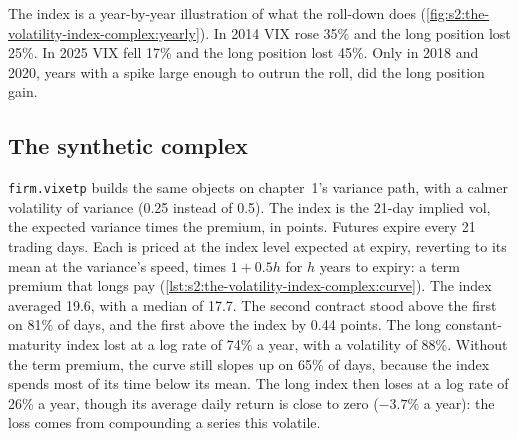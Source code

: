 \begin{omfigure}

\label{fig:s2:the-volatility-index-complex:yearly}
\end{omfigure}

The index is a year-by-year illustration of what the roll-down does (\cref{fig:s2:the-volatility-index-complex:yearly}). In 2014 VIX rose 35\% and the
long position lost 25\%. In 2025 VIX fell 17\% and the long position lost 45\%. Only in 2018 and 2020, years with a spike large enough to outrun the
roll, did the long position gain.

\subsection*{The synthetic complex}

\texttt{firm.vixetp} builds the same objects on chapter~1's variance path, with a calmer volatility of variance (0.25 instead of 0.5). The index is the
21-day implied vol, the expected variance times the premium, in points. Futures expire every 21 trading days. Each is priced at the index level
expected at expiry, reverting to its mean at the variance's speed, times $1 + 0.5h$ for $h$ years to expiry: a term premium that longs pay
(\cref{lst:s2:the-volatility-index-complex:curve}). The index averaged 19.6, with a median of 17.7. The second contract stood above the first on
81\% of days, and the first above the index by 0.44 points. The long constant-maturity index lost at a log rate of 74\% a year, with a volatility of
88\%. Without the term premium, the curve still slopes up on 65\% of days, because the index spends most of its time below its mean. The long index
then loses at a log rate of 26\% a year, though its average daily return is close to zero ($-3.7\%$ a
year): the loss comes from compounding a series this volatile.

